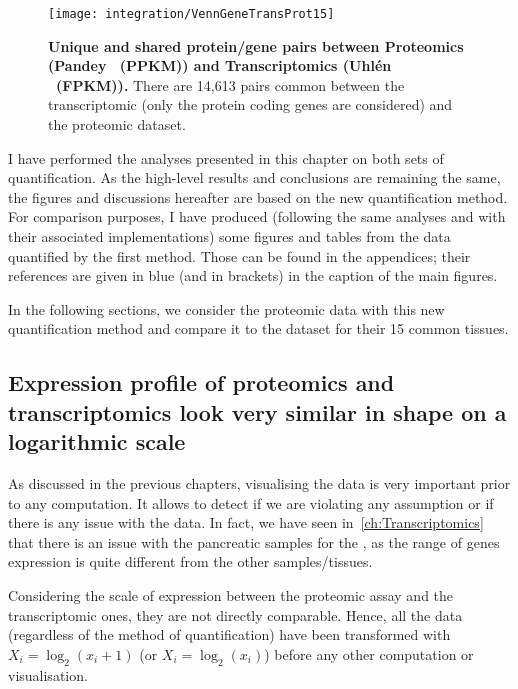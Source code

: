 \begin{figure}[!htbp]
    \texttt{[image: integration/VennGeneTransProt15]}\centering
    \caption[Unique and shared protein/gene pairs between Proteomics
    (Pandey \etal\ (PPKM)) and
    Transcriptomics (Uhlén \etal\ (\gls{FPKM}))]
    {\label{fig:VennGeneTransProt15}\textbf{Unique and shared protein/gene
    pairs between Proteomics (Pandey \etal\ (PPKM)) and Transcriptomics (Uhlén
    \etal\  (\gls{FPKM})).} There are 14,613 pairs common between the
    transcriptomic (only the protein coding genes are considered)
    and the proteomic dataset.}
\end{figure}

I have performed the analyses presented in this chapter on both sets of
quantification. As the high-level results and conclusions are remaining the same,
the figures and discussions hereafter are based on
the new quantification method. For comparison purposes,
I have produced (following the same analyses and with their associated
implementations) some figures and tables from the data quantified by the first
method. Those can be found in the appendices; their references
are given in blue (and in brackets) in the caption of the main figures.

In the following sections, we consider the proteomic data with this new
quantification method and compare it to the  dataset
for their 15 common tissues.

\subsection{Expression profile of proteomics and transcriptomics look very
similar in shape on a logarithmic scale}
\label{subsec:IntegrationExpProfileSim}

As discussed in the previous chapters, visualising the data is very important
prior to any computation. It allows to detect if we are violating
any assumption or if there is any issue with the data. In fact, we have seen
in~\cref{ch:Transcriptomics} that there is an issue with the pancreatic
samples for the , as the range of genes expression is quite
different from the other samples/tissues.

Considering the scale of expression between the proteomic assay and the
transcriptomic ones, they are not directly comparable. Hence,
all the data (regardless of the method of quantification) have been transformed
with $X_{i}=\log_{2} (x_{i}+1)$ (or $X_{i}=\log_{2} (x_{i})$)
before any other computation or visualisation.


